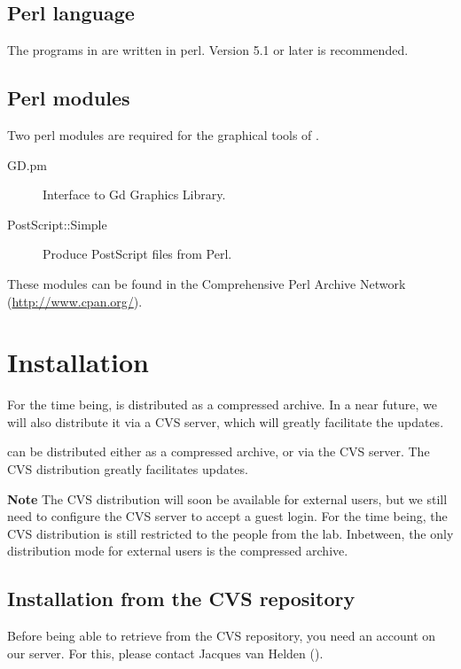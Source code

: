 \documentclass{article}
\begin{document}
\subsection{Perl language}

The programs in \RSAT are written in perl. Version 5.1 or
later is recommended.

\subsection{Perl modules}

Two perl modules are required for the graphical tools of \RSAT.

\begin{description}
\item[GD.pm] Interface to Gd Graphics Library.
\item[PostScript::Simple]  Produce PostScript files from Perl.
\end{description}

These modules can be found in the Comprehensive Perl Archive Network
(\url{http://www.cpan.org/}).


\section{Installation}

For the time being, \RSAT is distributed as a compressed archive. In a
near future, we will also distribute it via a CVS server, which will
greatly facilitate the updates.


\RSAT can be distributed either as a compressed archive, or via the CVS
server. The CVS distribution greatly facilitates updates.

\textbf{Note} The CVS distribution will soon be available for external
users, but we still need to configure the CVS server to accept a guest
login. For the time being, the CVS distribution is still restricted to
the people from the lab. Inbetween, the only distribution mode for
external users is the compressed archive.

\subsection{Installation from the CVS repository}


Before being able to retrieve \RSAT from the CVS repository, you need
an account on our server. For this, please contact Jacques van Helden
().
\end{document}
